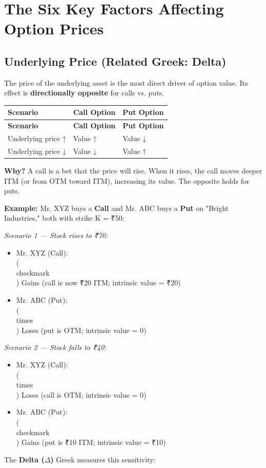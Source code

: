 \documentclass[12pt,openany]{book}
\theoremstyle{definition}
\theoremstyle{remark}
\begin{document}
\section{The Six Key Factors Affecting Option Prices}
\subsection{Underlying Price (Related Greek: Delta)}
The price of the underlying asset is the most direct driver of option value. Its effect is \textbf{directionally opposite} for calls vs. puts.

\begingroup
\footnotesize
\begin{longtable}{@{}L{0.19\textwidth}L{0.36\textwidth}L{0.36\textwidth}@{}}
\toprule
\textbf{Scenario} & \textbf{Call Option} & \textbf{Put Option} \\
\midrule
\endfirsthead
\toprule
\textbf{Scenario} & \textbf{Call Option} & \textbf{Put Option} \\
\midrule
\endhead
Underlying price ↑ & Value ↑ & Value ↓ \\
Underlying price ↓ & Value ↓ & Value ↑ \\
\bottomrule
\end{longtable}
\endgroup
\textbf{Why?} A call is a bet that the price will rise. When it rises, the call moves deeper ITM (or from OTM toward ITM), increasing its value. The opposite holds for puts.

\textbf{Example:} Mr. XYZ buys a \textbf{Call} and Mr. ABC buys a \textbf{Put} on "Bright Industries," both with strike K = ₹50:

\emph{Scenario 1 --- Stock rises to ₹70:}

\begin{itemize}
\item Mr. XYZ (Call): \textcolor{diagramGreen}{\\(\\checkmark\\)} Gains (call is now ₹20 ITM; intrinsic value = ₹20)


\item Mr. ABC (Put): \textcolor{bearc}{\\(\\times\\)} Loses (put is OTM; intrinsic value = 0)


\end{itemize}
\emph{Scenario 2 --- Stock falls to ₹40:}

\begin{itemize}
\item Mr. XYZ (Call): \textcolor{bearc}{\\(\\times\\)} Loses (call is OTM; intrinsic value = 0)


\item Mr. ABC (Put): \textcolor{diagramGreen}{\\(\\checkmark\\)} Gains (put is ₹10 ITM; intrinsic value = ₹10)


\end{itemize}
The \textbf{Delta (\(\Delta\))} Greek measures this sensitivity:
\end{document}
